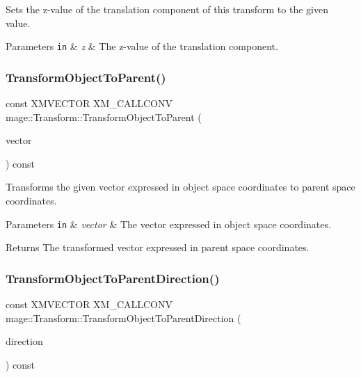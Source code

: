 Sets the z-\/value of the translation component of this transform to the given value.


\begin{DoxyParams}[1]{Parameters}
\mbox{\tt in}  & {\em z} & The z-\/value of the translation component. \\
\hline
\end{DoxyParams}
\hypertarget{structmage_1_1_transform_a622f8234d70768c33a3cbb8fa50932cc}{}\label{structmage_1_1_transform_a622f8234d70768c33a3cbb8fa50932cc} 
\subsubsection{\texorpdfstring{Transform\+Object\+To\+Parent()}{TransformObjectToParent()}}
{\footnotesize\ttfamily const X\+M\+V\+E\+C\+T\+OR X\+M\+\_\+\+C\+A\+L\+L\+C\+O\+NV mage\+::\+Transform\+::\+Transform\+Object\+To\+Parent (\begin{DoxyParamCaption}\item[{F\+X\+M\+V\+E\+C\+T\+OR}]{vector }\end{DoxyParamCaption}) const\hspace{0.3cm}{\ttfamily [noexcept]}}

Transforms the given vector expressed in object space coordinates to parent space coordinates.


\begin{DoxyParams}[1]{Parameters}
\mbox{\tt in}  & {\em vector} & The vector expressed in object space coordinates. \\
\hline
\end{DoxyParams}
\begin{DoxyReturn}{Returns}
The transformed vector expressed in parent space coordinates. 
\end{DoxyReturn}
\hypertarget{structmage_1_1_transform_afddbd41527257bf0ed20ceafa19b49c9}{}\label{structmage_1_1_transform_afddbd41527257bf0ed20ceafa19b49c9} 
\subsubsection{\texorpdfstring{Transform\+Object\+To\+Parent\+Direction()}{TransformObjectToParentDirection()}}
{\footnotesize\ttfamily const X\+M\+V\+E\+C\+T\+OR X\+M\+\_\+\+C\+A\+L\+L\+C\+O\+NV mage\+::\+Transform\+::\+Transform\+Object\+To\+Parent\+Direction (\begin{DoxyParamCaption}\item[{F\+X\+M\+V\+E\+C\+T\+OR}]{direction }\end{DoxyParamCaption}) const\hspace{0.3cm}{\ttfamily [noexcept]}}

